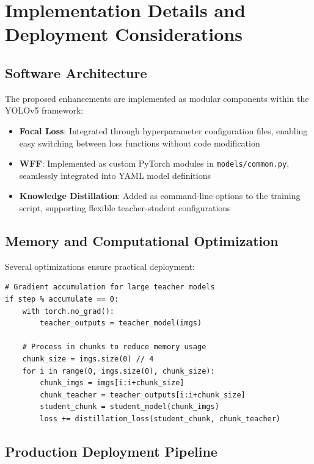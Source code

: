 \documentclass[journal]{IEEEtran}
\begin{document}
\section{Implementation Details and Deployment Considerations}

\subsection{Software Architecture}

The proposed enhancements are implemented as modular components within the YOLOv5 framework:

\begin{itemize}
\item \textbf{Focal Loss}: Integrated through hyperparameter configuration files, enabling easy switching between loss functions without code modification
\item \textbf{WFF}: Implemented as custom PyTorch modules in \texttt{models/common.py}, seamlessly integrated into YAML model definitions
\item \textbf{Knowledge Distillation}: Added as command-line options to the training script, supporting flexible teacher-student configurations
\end{itemize}

\subsection{Memory and Computational Optimization}

Several optimizations ensure practical deployment:

\begin{lstlisting}[caption=Memory-Efficient Distillation]
# Gradient accumulation for large teacher models
if step % accumulate == 0:
    with torch.no_grad():
        teacher_outputs = teacher_model(imgs)

    # Process in chunks to reduce memory usage
    chunk_size = imgs.size(0) // 4
    for i in range(0, imgs.size(0), chunk_size):
        chunk_imgs = imgs[i:i+chunk_size]
        chunk_teacher = teacher_outputs[i:i+chunk_size]
        student_chunk = student_model(chunk_imgs)
        loss += distillation_loss(student_chunk, chunk_teacher)
\end{lstlisting}

\subsection{Production Deployment Pipeline}
\end{document}
